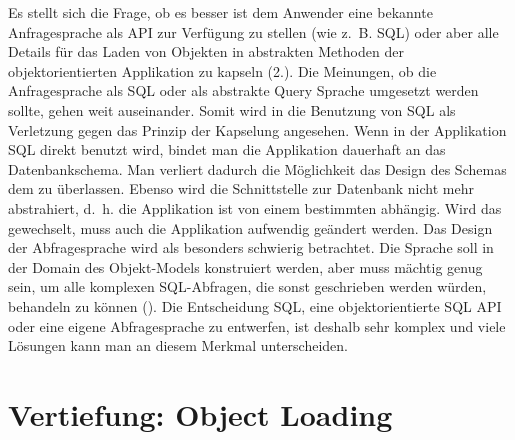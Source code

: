 Es stellt sich die Frage, ob es besser ist dem Anwender eine bekannte Anfragesprache als API zur Verfügung zu stellen (wie z.~B. SQL) oder aber alle Details für das Laden von Objekten in abstrakten Methoden der objektorientierten Applikation zu kapseln (2.). Die Meinungen, ob die Anfragesprache als SQL oder als abstrakte Query Sprache umgesetzt werden sollte, gehen weit auseinander. Somit wird in \cite[S. 7]{ambler-persistence-layer} die Benutzung von SQL als Verletzung gegen das Prinzip der Kapselung angesehen. Wenn in der Applikation SQL direkt benutzt wird, bindet man die Applikation dauerhaft an das Datenbankschema. Man verliert dadurch die Möglichkeit das Design des Schemas dem  zu überlassen. Ebenso wird die Schnittstelle zur Datenbank nicht mehr abstrahiert, d.~h. die Applikation ist von einem bestimmten \DBMS abhängig. Wird das \DBMS gewechselt, muss auch die Applikation aufwendig geändert werden. Das Design der Abfragesprache wird als besonders schwierig betrachtet. Die Sprache soll in der Domain des Objekt-Models konstruiert werden, aber muss mächtig genug sein, um alle komplexen SQL-Abfragen, die sonst geschrieben werden würden, behandeln zu können (\cite[S. 24]{russel-bridging}). Die Entscheidung SQL, eine objektorientierte SQL API oder eine eigene Abfragesprache zu entwerfen, ist deshalb sehr komplex und viele Lösungen kann man an diesem Merkmal unterscheiden.\\

\section{Vertiefung: Object Loading}\label{object-loading}

